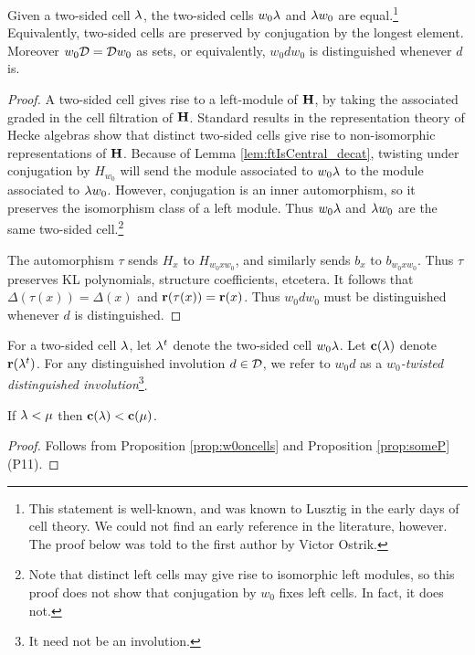 \begin{lemma} Given a two-sided cell $\lambda$, the two-sided cells $w_0 \lambda$ and $\lambda w_0$ are equal.\footnote{This statement is well-known, and was known to Lusztig in the early days of cell theory. We could not find an early reference in the literature, however. The proof below was told to the first author by Victor Ostrik.} Equivalently, two-sided cells are preserved by conjugation by the longest element. Moreover $w_0 {\mathcal{D}} = {\mathcal{D}} w_0$ as sets, or equivalently, $w_0 d w_0$ is distinguished whenever $d$ is. \end{lemma}

\begin{proof} A two-sided cell gives rise to a left-module of ${\mathbf H}$, by taking the associated graded in the cell filtration of ${\mathbf H}$. Standard results in the representation theory of Hecke algebras show that distinct two-sided cells give rise to non-isomorphic representations of ${\mathbf H}$. Because of Lemma \ref{lem:ftIsCentral_decat}, twisting under conjugation by $H_{w_0}$ will send the module associated to $w_0 \lambda$ to the module associated to $\lambda w_0$. However, conjugation is an inner automorphism, so it preserves the isomorphism class of a left module. Thus $w_0 \lambda$ and $\lambda w_0$ are the same two-sided cell.\footnote{Note that distinct left cells may give rise to isomorphic left modules, so this proof does not show that conjugation by $w_0$ fixes left cells. In fact, it does not.}

The automorphism $\tau$ sends $H_x$ to $H_{w_0 x w_0}$, and similarly sends $b_x$ to $b_{w_0 x w_0}$. Thus $\tau$ preserves KL polynomials, structure coefficients, etcetera. It follows that $\Delta(\tau(x)) = \Delta(x)$ and $\mathbf{r}(\tau(x)) = \mathbf{r}(x)$. Thus $w_0 d w_0$ must be distinguished whenever $d$ is distinguished. \end{proof}


\begin{defn} \label{defn:c} For a two-sided cell $\lambda$, let $\lambda^t$ denote the two-sided cell $w_0 \lambda$. Let $\mathbf{c}(\lambda)$ denote $\mathbf{r}(\lambda^t)$. For any distinguished involution $d \in {\mathcal{D}}$, we refer to $w_0 d$ as a \emph{$w_0$-twisted distinguished involution}\footnote{It need not be an involution.}. \end{defn}

\begin{lemma}\label{lemma:cineq}
If $\lambda<\mu$ then $\mathbf{c}(\lambda)<\mathbf{c}(\mu)$.
\end{lemma}
\begin{proof}
Follows from Proposition \ref{prop:w0oncells} and Proposition \ref{prop:someP} (P11).
\end{proof}
	

